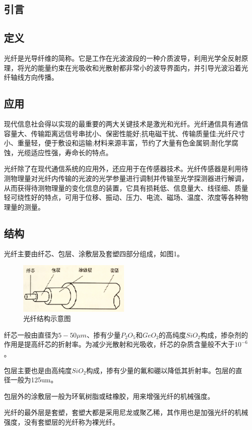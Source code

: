 \documentclass[UTF8]{ctexart}
\begin{document}
\begin{multicols}{2}
\section{引言}
\subsection{定义}
光纤是光导纤维的简称。它是工作在光波波段的一种介质波导，利用光学全反射原理，将光的能量约束在光吸收和光散射都非常小的波导界面内，并引导光波沿着光纤轴线方向传播。

\subsection{应用}
现代信息社会得以实现的最重要的两大关键技术是激光和光纤。光纤通信具有通信容量大、传输距离远信号串扰小、保密性能好;抗电磁干扰、传输质量佳;光纤尺寸小、重量轻，便于敷设和运输;材料来源丰富，节约了大量有色金属铜;耐化学腐蚀，光缆适应性强，寿命长的特点。

光纤除了在现代通信系统的应用外，还应用于在传感器技术。光纤传感器是利用待测物理量对光纤内传输的光波的光学参量进行调制并传输至光学探测器进行解调，从而获得待测物理量的变化信息的装置，它具有损耗低、信息量大、线径细、质量轻可绕性好的特点，可用于位移、振动、压力、电流、磁场、温度、浓度等各种物理量的测量。
\subsection{结构}
光纤主要由纤芯、包层、涂敷层及套塑四部分组成，如图1。
\begin{figure}[H]
\centering
\includegraphics[width=5.5cm]{sturcture}
\caption{光纤结构示意图}
\end{figure}

纤芯一般由直径为$5-50\mu m$、掺有少量$P_2O_5$和$GeO_2$的高纯度$SiO_2$构成，掺杂剂的作用是提高纤芯的折射率。为减少光散射和光吸收，纤芯的杂质含量般不大于$10^{-6}$。

包层主要也是由高纯度$SiO_2$构成，掺有少量的氟和硼以降低其折射率。包层的直径一般为125um。

包层外的涂敷层一般为环氧树脂或硅橡胶，用来增强光纤的机械强度。

光纤的最外层是套塑，套塑大都是采用尼龙或聚乙稀，其作用也是加强光纤的机械强度，没有套塑层的光纤称为裸光纤。


\end{multicols}
\end{document}
